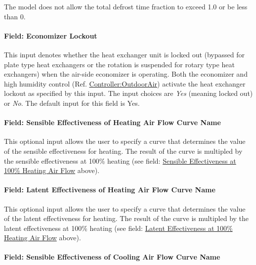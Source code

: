 The model does not allow the total defrost time fraction to exceed 1.0 or be less than 0.

\paragraph{Field: Economizer Lockout}\label{field-economizer-lockout-1}

This input denotes whether the heat exchanger unit is locked out (bypassed for plate type heat exchangers or the rotation is suspended for rotary type heat exchangers) when the air-side economizer is operating. Both the economizer and high humidity control (Ref. \hyperref[controlleroutdoorair]{Controller:OutdoorAir}) activate the heat exchanger lockout as specified by this input. The input choices are \emph{Yes} (meaning locked out) or \emph{No}. The default input for this field is Yes.

\paragraph{Field: Sensible Effectiveness of Heating Air Flow Curve Name}\label{field-sensible-effectiveness-of-heating-air-flow-curve-name-1}

This optional input allows the user to specify a curve that determines the value of the sensible effectiveness for heating.  The result of the curve is multipled by the sensible effectiveness at 100\% heating (see field: \hyperref[field-sensible-effectiveness-at-100-heating-air-flow]{Sensible Effectiveness at 100\% Heating Air Flow} above).

\paragraph{Field: Latent Effectiveness of Heating Air Flow Curve Name}\label{field-latent-effectiveness-of-heating-air-flow-curve-name-1}

This optional input allows the user to specify a curve that determines the value of the latent effectiveness for heating.  The result of the curve is multipled by the latent effectiveness at 100\% heating (see field: \hyperref[field-latent-effectiveness-at-100-heating-air-flow]{Latent Effectiveness at 100\% Heating Air Flow} above).

\paragraph{Field: Sensible Effectiveness of Cooling Air Flow Curve Name}\label{field-sensible-effectiveness-of-cooling-air-flow-curve-name-1}


